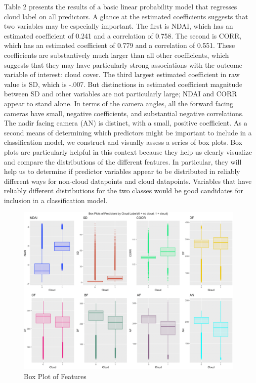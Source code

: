 \documentclass[12pt]{article}
\begin{document}
\noindent Table 2 presents the results of a basic linear probability model that regresses cloud label on all predictors. A glance at the estimated coefficients suggests that two variables may be especially important. The first is NDAI, which has an estimated coefficient of 0.241 and a correlation of 0.758. The second is CORR, which has an estimated coefficient of 0.779 and a correlation of 0.551. These coefficients are substantively much larger than all other coefficients, which suggests that they may have particularly strong associations with the outcome variable of interest: cloud cover. The third largest estimated coefficient in raw value is SD, which is -.007. But distinctions in estimated coefficient magnitude between SD and other variables are not particularly large; NDAI and CORR appear to stand alone. In terms of the camera angles, all the forward facing cameras have small, negative coefficients, and substantial negative correlations. The nadir facing camera (AN) is distinct, with a small, positive coefficient. 
\newline
\newline
As a second means of determining which predictors might be important to include in a classification model, we construct and visually assess a series of box plots.  Box plots are particularly helpful in this context because they help us clearly visualize and compare the distributions of the different features. In particular, they will help us to determine if predictor variables appear to be distributed in reliably different ways for non-cloud datapoints and cloud datapoints. Variables that have reliably different distributions for the two classes would be good candidates for inclusion in a classification model.    
\begin{figure}[htp]
\caption{Box Plot of Features}
\includegraphics[width=12cm]{Fig3.png}
\centering
\end{figure}
\end{document}

